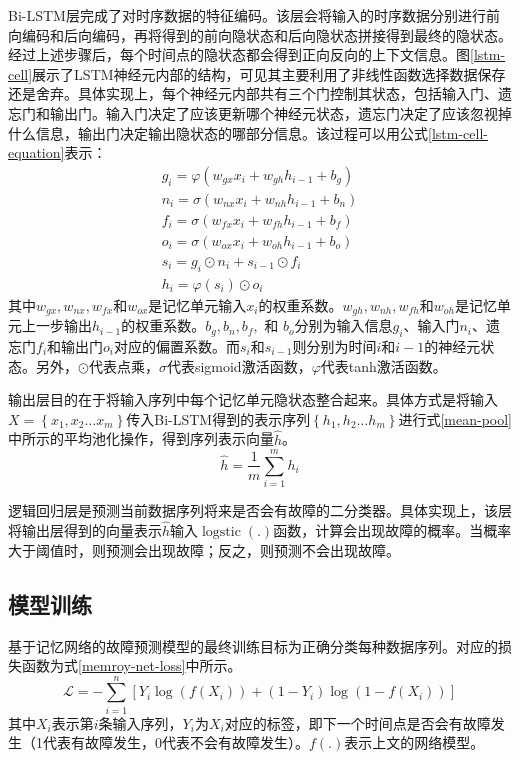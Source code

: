 Bi-LSTM层完成了对时序数据的特征编码。该层会将输入的时序数据分别进行前向编码和后向编码，再将得到的前向隐状态和后向隐状态拼接得到最终的隐状态。经过上述步骤后，每个时间点的隐状态都会得到正向反向的上下文信息。图\ref{lstm-cell}展示了LSTM神经元内部的结构，可见其主要利用了非线性函数选择数据保存还是舍弃。具体实现上，每个神经元内部共有三个门控制其状态，包括输入门、遗忘门和输出门。输入门决定了应该更新哪个神经元状态，遗忘门决定了应该忽视掉什么信息，输出门决定输出隐状态的哪部分信息。该过程可以用公式\ref{lstm-cell-equation}表示：
\begin{equation}
    \begin{array}{l}
    g_{i}=\varphi\left(w_{g x} x_{i}+w_{g h} h_{i - 1}+b_{g}\right) \\
    n_{i}=\sigma\left(w_{n x} x_{i}+w_{n h} h_{i- 1}+b_{n}\right) \\
    f_{i}=\sigma\left(w_{f x} x_{i}+w_{f h} h_{i- 1}+b_{f}\right) \\
    o_{i}=\sigma\left(w_{o x} x_{i}+w_{o h} h_{i- 1}+b_{o}\right) \\
    s_{i}=g_{i} \odot n_{i}+s_{i -1} \odot f_{i} \\
    h_{i}=\varphi\left(s_{i}\right) \odot o_{i}
    \end{array}
    \label{lstm-cell-equation}
\end{equation}
其中$w_{gx}, w_{nx}, w_{fx} $和$w_{ox} $是记忆单元输入$x_{i}$的权重系数。$w_{gh}, w_{nh}, w_{fh} $和$w_{oh} $是记忆单元上一步输出$h_{i-1}$的权重系数。$b_{g}, b_{n}, b_{f},$ 和 $b_{o}$分别为输入信息$g_{i}$、输入门$n_{i}$、遗忘门$f_{i}$和输出门$o_{i}$对应的偏置系数。而$s_{i}$和$s_{i-1}$则分别为时间$i$和$i-1$的神经元状态。另外，$\odot$代表点乘，$\sigma$代表sigmoid激活函数，$\varphi$代表tanh激活函数。

输出层目的在于将输入序列中每个记忆单元隐状态整合起来。具体方式是将输入$X=\left\{x_{1}, x_{2} \ldots x_{m}\right\}$传入Bi-LSTM得到的表示序列$\left\{h_{1}, h_{2} \ldots h_{m}\right\}$进行式\ref{mean-pool}中所示的平均池化操作，得到序列表示向量$\widehat{h}$。
\begin{equation}
    \widehat{h}=\frac{1}{m} \sum_{i=1}^{m} h_{i}
    \label{mean-pool}
\end{equation}

逻辑回归层是预测当前数据序列将来是否会有故障的二分类器。具体实现上，该层将输出层得到的向量表示$\widehat{h}$输入$\operatorname{logstic}(.)$函数，计算会出现故障的概率。当概率大于阈值时，则预测会出现故障；反之，则预测不会出现故障。

\subsection{模型训练}
基于记忆网络的故障预测模型的最终训练目标为正确分类每种数据序列。对应的损失函数为式\ref{memroy-net-loss}中所示。
\begin{equation}
    \mathcal{L}=-\sum_{i=1}^{n}\left[Y_{i} \log \left(f\left(X_{i} \right)\right)+\left(1-Y_{i}\right) \log \left(1-f\left(X_{i} \right)\right)\right]
    \label{memroy-net-loss}
\end{equation}
其中$X_{i}$表示第$i$条输入序列，$Y_{i}$为$X_{i}$对应的标签，即下一个时间点是否会有故障发生（1代表有故障发生，0代表不会有故障发生）。$f\left(.\right)$表示上文的网络模型。
